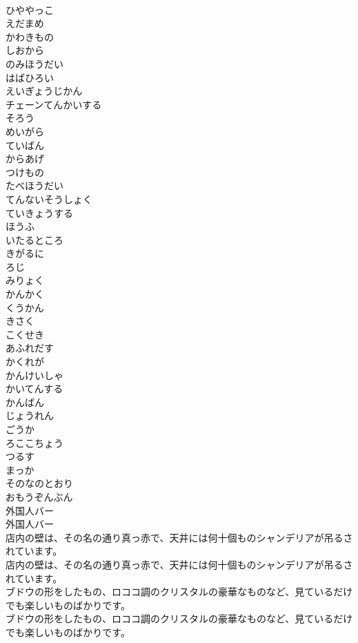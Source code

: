\documentclass[8pt]{extreport}
\begin{document}
\begin{CJK}{UTF8}{min}
\\	ひややっこ
\\	えだまめ
\\	かわきもの
\\	しおから
\\	のみほうだい
\\	はばひろい
\\	えいぎょうじかん
\\	チェーンてんかいする
\\	そろう
\\	めいがら
\\	ていばん
\\	からあげ
\\	つけもの
\\	たべほうだい
\\	てんないそうしょく
\\	ていきょうする
\\	ほうふ
\\	いたるところ
\\	きがるに
\\	ろじ
\\	みりょく
\\	かんかく
\\	くうかん
\\	きさく
\\	こくせき
\\	あふれだす
\\	かくれが
\\	かんけいしゃ
\\	かいてんする
\\	かんばん
\\	じょうれん
\\	ごうか
\\	ろここちょう
\\	つるす
\\	まっか
\\	そのなのとおり
\\	おもうぞんぶん
\\	外国人バー
\\	外国人バー
\\	店内の壁は、その名の通り真っ赤で、天井には何十個ものシャンデリアが吊るされています。
\\	店内の壁は、その名の通り真っ赤で、天井には何十個ものシャンデリアが吊るされています。
\\	ブドウの形をしたもの、ロココ調のクリスタルの豪華なものなど、見ているだけでも楽しいものばかりです。
\\	ブドウの形をしたもの、ロココ調のクリスタルの豪華なものなど、見ているだけでも楽しいものばかりです。

\end{CJK}
\end{document}
